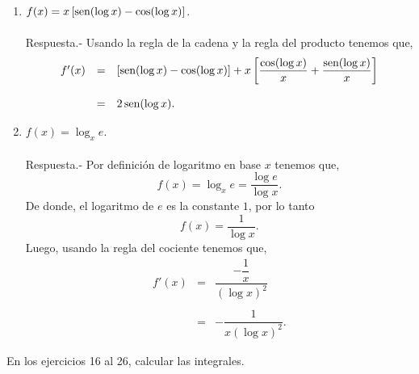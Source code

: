 \begin{enumerate}[\bfseries 1.]
    \item $f(x)=x\left[\mathop{\mbox{\normalfont sen}}\nolimits(\log x)-\cos(\log x)\right]$.\\\\
	Respuesta.-\; Usando la regla de la cadena y la regla del producto tenemos que,
	$$
	\begin{array}{rcl}
	    f'(x) &=& \left[\mathop{\mbox{\normalfont sen}}\nolimits(\log x)-\cos(\log x)\right]+x\left[\dfrac{\cos(\log x)}{x}+\dfrac{\mathop{\mbox{\normalfont sen}}\nolimits(\log x)}{x}\right]\\\\
		  &=& 2\mathop{\mbox{\normalfont sen}}\nolimits(\log x).
	\end{array}
	$$
	\vspace{.5cm}

    \item $f(x)=\log_xe$.\\\\
	Respuesta.-\; Por definición de logaritmo en base $x$ tenemos que,
	$$f(x)=\log_xe=\dfrac{\log e}{\log x}.$$
	De donde, el logaritmo de $e$ es la constante $1$, por lo tanto
	$$f(x)=\dfrac{1}{\log x}.$$
	Luego, usando la regla del cociente tenemos que,
	$$	
	\begin{array}{rcl}
	    f'(x) &=& \dfrac{-\dfrac{1}{x}}{\left(\log x\right)^2}\\\\
		  &=& -\dfrac{1}{x\left(\log x\right)^2}.
	\end{array}
	$$
	\vspace{.5cm}

\end{enumerate}

En los ejercicios 16 al 26, calcular las integrales.\\

